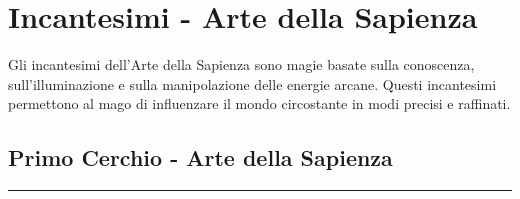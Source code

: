 \documentclass[./magie.tex]{subfiles}
\begin{document}
\section{Incantesimi - Arte della Sapienza}

Gli incantesimi dell'Arte della Sapienza sono magie basate sulla conoscenza, sull'illuminazione e sulla manipolazione delle energie arcane. Questi incantesimi permettono al mago di influenzare il mondo circostante in modi precisi e raffinati.

 \subsection*{Primo Cerchio - Arte della Sapienza}

\vspace{0.2cm}
\noindent
\begin{center}
\rule{\textwidth}{0.4pt} 
\end{center}
\vspace{0.2cm}
\end{document}
